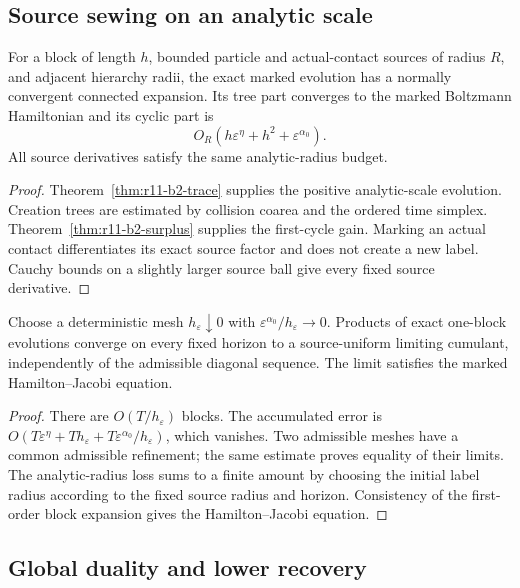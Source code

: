 \subsection{Source sewing on an analytic scale}

\begin{theorem}
\label{thm:r11-b2-block}
For a block of length $h$, bounded particle and actual-contact sources of
radius $R$, and adjacent hierarchy radii, the exact marked evolution has a
normally convergent connected expansion.  Its tree part converges to the
marked Boltzmann Hamiltonian and its cyclic part is
\[
 O_R(h\varepsilon^{\eta}+h^2+\varepsilon^{\alpha_0}).
\]
All source derivatives satisfy the same analytic-radius budget.
\end{theorem}

\begin{proof}
Theorem~\ref{thm:r11-b2-trace} supplies the positive analytic-scale evolution.
Creation trees are estimated by collision coarea and the ordered time simplex.
Theorem~\ref{thm:r11-b2-surplus} supplies the first-cycle gain.  Marking an
actual contact differentiates its exact source factor and does not create a
new label.  Cauchy bounds on a slightly larger source ball give every fixed
source derivative.
\end{proof}

\begin{theorem}
\label{thm:r11-b2-sewing}
Choose a deterministic mesh $h_\varepsilon\downarrow0$ with
$\varepsilon^{\alpha_0}/h_\varepsilon\to0$.  Products of exact one-block
evolutions converge on every fixed horizon to a source-uniform limiting
cumulant, independently of the admissible diagonal sequence.  The limit
satisfies the marked Hamilton--Jacobi equation.
\end{theorem}

\begin{proof}
There are $O(T/h_\varepsilon)$ blocks.  The accumulated error is
$O(T\varepsilon^\eta+Th_\varepsilon+
T\varepsilon^{\alpha_0}/h_\varepsilon)$, which vanishes.  Two admissible
meshes have a common admissible refinement; the same estimate proves equality
of their limits.  The analytic-radius loss sums to a finite amount by choosing
the initial label radius according to the fixed source radius and horizon.
Consistency of the first-order block expansion gives the Hamilton--Jacobi
equation.
\end{proof}

\subsection{Global duality and lower recovery}


